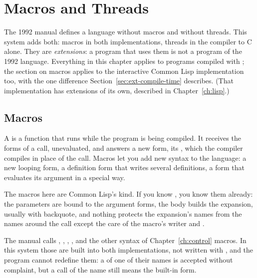 \chapter{Macros and Threads}\label{ch:extensions}
\sloppy

The 1992 manual defines a language without macros and without threads.
This system adds both: macros in both implementations, threads in the
compiler to C alone. They are \emph{extensions}: a program that uses
them is not a program of the 1992 language. Everything in this chapter
applies to programs compiled with ; the section on macros
applies to the interactive Common Lisp implementation too, with the one
difference Section~\ref{sec:ext-compile-time} describes. (That
implementation has extensions of its own, described in
Chapter~\ref{ch:lisp}.)

\section{Macros}\label{sec:ext-macros}

A  is a function that runs while the program is being
compiled. It receives the forms of a call, unevaluated, and answers a new
form, its , which the compiler compiles in place of the
call. Macros let you add new syntax to the language: a new looping form,
a definition form that writes several definitions, a form that evaluates
its argument in a special way.

The macros here are Common Lisp's kind. If you know , you
know them already: the parameters are bound to the argument forms, the
body builds the expansion, usually with backquote, and nothing protects
the expansion's names from the names around the call except the care of
the macro's writer and .

The manual calls , , , ,
 and the other syntax of Chapter~\ref{ch:control} macros. In
this system those are built into both implementations, not written with
, and the program cannot redefine them: a
 of one of their names is accepted without complaint,
but a call of the name still means the built-in form.

\subsection{}\label{sec:ext-define-macro}

